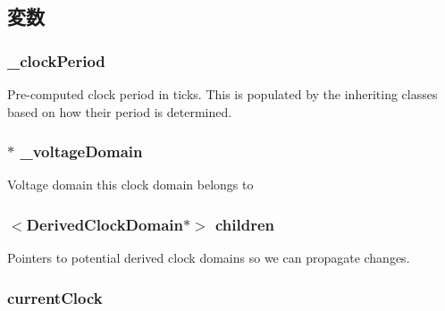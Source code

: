 \subsection{変数}
\hypertarget{classClockDomain_ae748f231d6123b4a17cb15ec3d8fba30}{
\subsubsection[{\_\-clockPeriod}]{ {\bf \_\-clockPeriod}}}
\label{classClockDomain_ae748f231d6123b4a17cb15ec3d8fba30}
Pre-\/computed clock period in ticks. This is populated by the inheriting classes based on how their period is determined. \hypertarget{classClockDomain_a08909200ef8d20553ab6de1a129e3171}{
\subsubsection[{\_\-voltageDomain}]{$\ast$ {\bf \_\-voltageDomain}}}
\label{classClockDomain_a08909200ef8d20553ab6de1a129e3171}
Voltage domain this clock domain belongs to \hypertarget{classClockDomain_a8c4ecdda30297cf1946c5ebbe19e2d11}{
\subsubsection[{children}]{$<${\bf DerivedClockDomain}$\ast$$>$ {\bf children}}}
\label{classClockDomain_a8c4ecdda30297cf1946c5ebbe19e2d11}
Pointers to potential derived clock domains so we can propagate changes. \hypertarget{classClockDomain_a0073be3bd6bc1f374821ccaf28afb854}{
\subsubsection[{currentClock}]{ {\bf currentClock}}}
